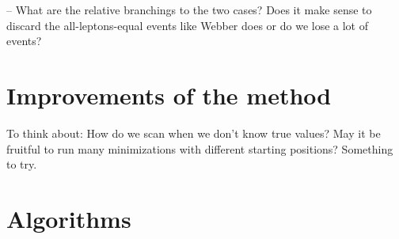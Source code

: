 \documentclass[twoside,english]{uiofysmaster}
\begin{document}
-- What are the relative branchings to the two cases? Does it make sense to discard the all-leptons-equal events like Webber does or do we lose a lot of events?










\chapter{Improvements of the method}
To think about: How do we scan when we don't know true values? May it be fruitful to run many minimizations with different starting positions? Something to try.




\appendix

\chapter{Algorithms}
\end{document}
